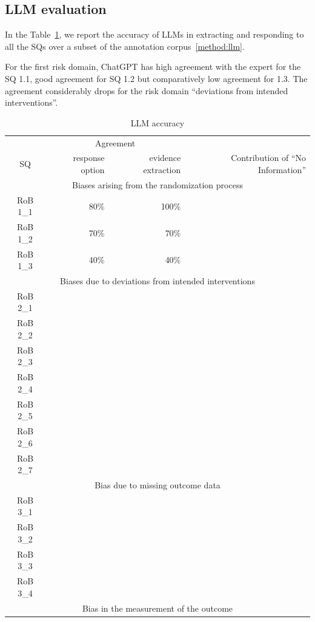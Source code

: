 \documentclass[sn-mathphys,Numbered]{sn-jnl}%
\theoremstyle{thmstyleone}%
\theoremstyle{thmstyletwo}%
\theoremstyle{thmstylethree}%
\begin{document}
%
%
%
\subsection{LLM evaluation}
%
In the Table~\ref{table:LLM_eval}, we report the accuracy of LLMs in extracting and responding to all the SQs over a subset of the annotation corpus~\ref{method:llm}.

For the first risk domain, ChatGPT has high agreement with the expert for the SQ 1.1, good agreement for SQ 1.2 but comparatively low agreement for 1.3.
The agreement considerably drops for the risk domain ``deviations from intended interventions''.
%
%
%
\begin{table}[htb]
    \caption{LLM accuracy}
    \label{table:LLM_eval}
    \centering
    \begin{tabular}{crrr}
    \toprule[1.0pt]
     & \multicolumn{2}{c}{Agreement} \\
        SQ & response option & evidence extraction & Contribution of ``No Information'' \\ 
    \midrule[1.0pt]
        \multicolumn{4}{c}{Biases arising from the randomization process} \\
        \hline
        RoB 1\_1 & 80\% & 100\% & \\ 
        RoB 1\_2 & 70\% & 70\% &  \\ 
        RoB 1\_3 & 40\% & 40\% & \\ 
        \hline
        \multicolumn{4}{c}{Biases due to deviations from intended interventions} \\
        \hline
        RoB 2\_1 & & & \\ 
        RoB 2\_2 & & & \\ 
        RoB 2\_3 & & & \\ 
        RoB 2\_4 & & & \\ 
        RoB 2\_5 & & & \\ 
        RoB 2\_6 & & & \\ 
        RoB 2\_7 & & & \\ 
        \hline
        \multicolumn{4}{c}{Bias due to missing outcome data} \\
        \hline
        RoB 3\_1 & & & \\ 
        RoB 3\_2 & & & \\ 
        RoB 3\_3 & & & \\ 
        RoB 3\_4 & & & \\ 
        \hline
        \multicolumn{4}{c}{Bias in the measurement of the outcome} \\

\end{tabular}
\end{table}
\end{document}
